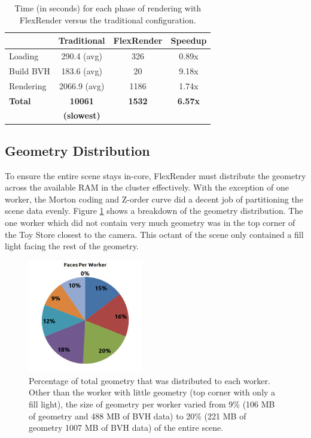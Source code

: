 \documentclass[a4paper,twoside]{article}
\begin{document}
\begin{table}
\begin{center}
\begin{tabular}{|l||c|c|c|}
    \hline
    & Traditional & FlexRender & Speedup \\
    \hline
    \hline
    Loading & 290.4 (avg) & 326 & 0.89x \\
    \hline
    Build BVH & 183.6 (avg) & 20 & 9.18x \\
    \hline
    Rendering & 2066.9 (avg) & 1186 & 1.74x \\
    \hline
    \hline
    \textbf{Total} & \textbf{10061} & \textbf{1532} & \textbf{6.57x} \\
    & \textbf{(slowest)} & & \\
    \hline
\end{tabular}
\caption{Time (in seconds) for each phase of rendering with FlexRender versus the traditional configuration.}
\label{tb:flexrendertimes}
\end{center}
\end{table}

\subsection{Geometry Distribution}
\label{geomdist}

To ensure the entire scene stays in-core, FlexRender must distribute the
geometry across the available RAM in the cluster effectively. With the exception
of one worker, the Morton coding and Z-order curve did a decent job of
partitioning the scene data evenly. Figure \ref{fig:geomdist} shows a breakdown
of the geometry distribution. The one worker which did not contain very much
geometry was in the top corner of the Toy Store closest to the camera. This
octant of the scene only contained a fill light facing the rest of the geometry.

\begin{figure}[h!]
    \centering
    \includegraphics[width=50mm]{figures/facesperworker.png}
    \caption{Percentage of total geometry that was distributed to each worker. Other than the worker with little geometry (top corner with only a fill light), the size of geometry per worker varied from 9\% (106 MB of geometry and 488 MB of BVH data) to 20\% (221 MB of geometry 1007 MB of BVH data) of the entire scene.}
    \label{fig:geomdist}
\end{figure}
\end{document}
